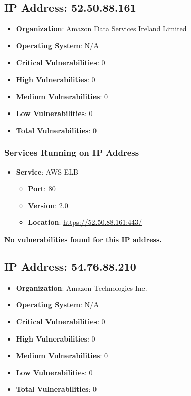 \documentclass{article}
\begin{document}
\clearpage



\subsection*{IP Address: 52.50.88.161}

\begin{itemize}
    \item \textbf{Organization}: Amazon Data Services Ireland Limited
    \item \textbf{Operating System}:  N/A 
    \item \textbf{Critical Vulnerabilities}: 0
    \item \textbf{High Vulnerabilities}: 0
    \item \textbf{Medium Vulnerabilities}: 0
    \item \textbf{Low Vulnerabilities}: 0
    \item \textbf{Total Vulnerabilities}: 0
\end{itemize}

\subsubsection*{Services Running on IP Address}

\begin{itemize}
    
        \item \textbf{Service}: AWS ELB
        \begin{itemize}
            \item \textbf{Port}: 80
            \item \textbf{Version}:  2.0 
            \item \textbf{Location}: \href{ https://52.50.88.161:443/ }{ https://52.50.88.161:443/ }
        \end{itemize}
    
\end{itemize}


\textbf{No vulnerabilities found for this IP address.}




\clearpage



\subsection*{IP Address: 54.76.88.210}

\begin{itemize}
    \item \textbf{Organization}: Amazon Technologies Inc.
    \item \textbf{Operating System}:  N/A 
    \item \textbf{Critical Vulnerabilities}: 0
    \item \textbf{High Vulnerabilities}: 0
    \item \textbf{Medium Vulnerabilities}: 0
    \item \textbf{Low Vulnerabilities}: 0
    \item \textbf{Total Vulnerabilities}: 0
\end{itemize}
\end{document}

